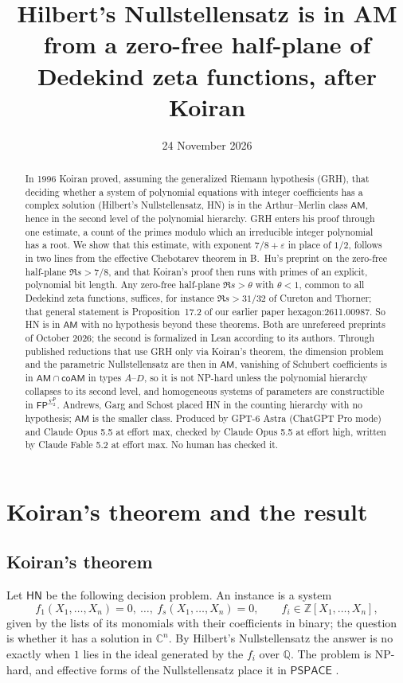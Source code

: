 \documentclass[11pt]{amsart}
\title[Hilbert's Nullstellensatz in AM]{Hilbert's Nullstellensatz is in AM from a zero-free half-plane of Dedekind zeta functions, after Koiran}
\author{}
\date{24 November 2026}
\theoremstyle{definition}
\theoremstyle{remark}
\newcommand{\Z}{\mathbb Z}
\newcommand{\Q}{\mathbb Q}
\newcommand{\C}{\mathbb C}
\newcommand{\cl}[1]{\mathsf{#1}}
\newcommand{\HN}{\cl{HN}}
\newcommand{\AM}{\cl{AM}}
\newcommand{\Sigtwo}{\Sigma_2^{\cl P}}
\begin{document}
\begin{abstract}
In 1996 Koiran proved, assuming the generalized Riemann hypothesis (GRH), that deciding whether a system of polynomial equations with integer coefficients has a complex solution (Hilbert's Nullstellensatz, HN) is in the Arthur--Merlin class $\AM$, hence in the second level of the polynomial hierarchy. GRH enters his proof through one estimate, a count of the primes modulo which an irreducible integer polynomial has a root. We show that this estimate, with exponent $7/8+\varepsilon$ in place of $1/2$, follows in two lines from the effective Chebotarev theorem in B.~Hu's preprint on the zero-free half-plane $\Re s>7/8$, and that Koiran's proof then runs with primes of an explicit, polynomial bit length. Any zero-free half-plane $\Re s>\theta$ with $\theta<1$, common to all Dedekind zeta functions, suffices, for instance $\Re s>31/32$ of Cureton and Thorner; that general statement is Proposition~17.2 of our earlier paper hexagon:2611.00987. So HN is in $\AM$ with no hypothesis beyond these theorems. Both are unrefereed preprints of October 2026; the second is formalized in Lean according to its authors. Through published reductions that use GRH only via Koiran's theorem, the dimension problem and the parametric Nullstellensatz are then in $\AM$, vanishing of Schubert coefficients is in $\AM\cap\cl{coAM}$ in types $A$--$D$, so it is not NP-hard unless the polynomial hierarchy collapses to its second level, and homogeneous systems of parameters are constructible in $\cl{FP}^{\Sigtwo}$. Andrews, Garg and Schost placed HN in the counting hierarchy with no hypothesis; $\AM$ is the smaller class. Produced by GPT-6 Astra (ChatGPT Pro mode) and Claude Opus 5.5 at effort max, checked by Claude Opus 5.5 at effort high, written by Claude Fable 5.2 at effort max. No human has checked it.
\end{abstract}

\maketitle

\section{Koiran's theorem and the result}

\subsection{Koiran's theorem}
Let $\HN$ be the following decision problem. An instance is a system
\begin{equation}\label{eq:system}
 f_1(X_1,\dots,X_n)=0,\ \dots,\ f_s(X_1,\dots,X_n)=0,\qquad f_i\in\Z[X_1,\dots,X_n],
\end{equation}
given by the lists of its monomials with their coefficients in binary; the question is whether it has a solution in $\C^n$. By Hilbert's Nullstellensatz the answer is no exactly when $1$ lies in the ideal generated by the $f_i$ over $\Q$. The problem is NP-hard, and effective forms of the Nullstellensatz place it in $\cl{PSPACE}$ \cite[\S1]{K96}.
\end{document}

